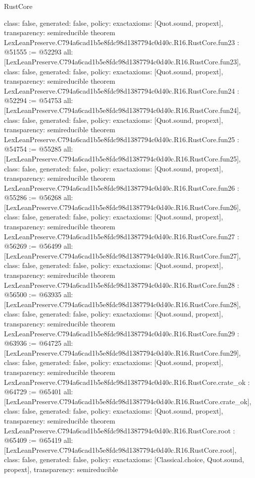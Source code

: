 \begin{lexlean}{RustCore}
\begin{coremodule}
{  class: false,
  generated: false,
  policy: exact{axioms: [Quot.sound, propext]},
  transparency: semireducible
}
theorem LexLeanPreserve.C794a6cad1b5e8fdc98d1387794c0d40c.R16.RustCore.fun23 : @51555 := @52293 {
  all: [LexLeanPreserve.C794a6cad1b5e8fdc98d1387794c0d40c.R16.RustCore.fun23],
  class: false,
  generated: false,
  policy: exact{axioms: [Quot.sound, propext]},
  transparency: semireducible
}
theorem LexLeanPreserve.C794a6cad1b5e8fdc98d1387794c0d40c.R16.RustCore.fun24 : @52294 := @54753 {
  all: [LexLeanPreserve.C794a6cad1b5e8fdc98d1387794c0d40c.R16.RustCore.fun24],
  class: false,
  generated: false,
  policy: exact{axioms: [Quot.sound, propext]},
  transparency: semireducible
}
theorem LexLeanPreserve.C794a6cad1b5e8fdc98d1387794c0d40c.R16.RustCore.fun25 : @54754 := @55285 {
  all: [LexLeanPreserve.C794a6cad1b5e8fdc98d1387794c0d40c.R16.RustCore.fun25],
  class: false,
  generated: false,
  policy: exact{axioms: [Quot.sound, propext]},
  transparency: semireducible
}
theorem LexLeanPreserve.C794a6cad1b5e8fdc98d1387794c0d40c.R16.RustCore.fun26 : @55286 := @56268 {
  all: [LexLeanPreserve.C794a6cad1b5e8fdc98d1387794c0d40c.R16.RustCore.fun26],
  class: false,
  generated: false,
  policy: exact{axioms: [Quot.sound, propext]},
  transparency: semireducible
}
theorem LexLeanPreserve.C794a6cad1b5e8fdc98d1387794c0d40c.R16.RustCore.fun27 : @56269 := @56499 {
  all: [LexLeanPreserve.C794a6cad1b5e8fdc98d1387794c0d40c.R16.RustCore.fun27],
  class: false,
  generated: false,
  policy: exact{axioms: [Quot.sound, propext]},
  transparency: semireducible
}
theorem LexLeanPreserve.C794a6cad1b5e8fdc98d1387794c0d40c.R16.RustCore.fun28 : @56500 := @63935 {
  all: [LexLeanPreserve.C794a6cad1b5e8fdc98d1387794c0d40c.R16.RustCore.fun28],
  class: false,
  generated: false,
  policy: exact{axioms: [Quot.sound, propext]},
  transparency: semireducible
}
theorem LexLeanPreserve.C794a6cad1b5e8fdc98d1387794c0d40c.R16.RustCore.fun29 : @63936 := @64725 {
  all: [LexLeanPreserve.C794a6cad1b5e8fdc98d1387794c0d40c.R16.RustCore.fun29],
  class: false,
  generated: false,
  policy: exact{axioms: [Quot.sound, propext]},
  transparency: semireducible
}
theorem LexLeanPreserve.C794a6cad1b5e8fdc98d1387794c0d40c.R16.RustCore.crate_ok : @64729 := @65401 {
  all: [LexLeanPreserve.C794a6cad1b5e8fdc98d1387794c0d40c.R16.RustCore.crate_ok],
  class: false,
  generated: false,
  policy: exact{axioms: [Quot.sound, propext]},
  transparency: semireducible
}
theorem LexLeanPreserve.C794a6cad1b5e8fdc98d1387794c0d40c.R16.RustCore.root : @65409 := @65419 {
  all: [LexLeanPreserve.C794a6cad1b5e8fdc98d1387794c0d40c.R16.RustCore.root],
  class: false,
  generated: false,
  policy: exact{axioms: [Classical.choice, Quot.sound, propext]},
  transparency: semireducible
}


\end{coremodule}
\end{lexlean}
